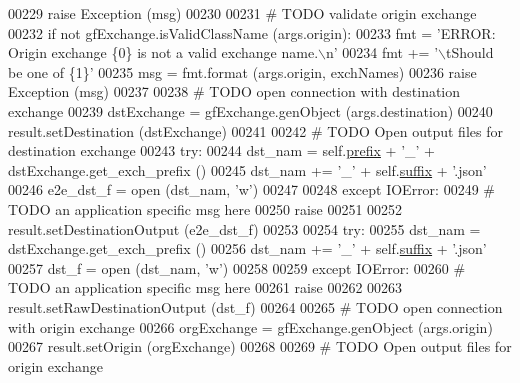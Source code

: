 \begin{DoxyCode}
{00229             \textcolor{keywordflow}{raise} Exception (msg)
00230             
00231         \textcolor{comment}{# TODO validate origin exchange}
00232         \textcolor{keywordflow}{if} \textcolor{keywordflow}{not} gfExchange.isValidClassName (args.origin):
00233             fmt  = \textcolor{stringliteral}{'ERROR: Origin exchange \{0\} is not a valid exchange name.\(\backslash\)n'}
00234             fmt += \textcolor{stringliteral}{'\(\backslash\)tShould be one of \{1\}'}
00235             msg = fmt.format (args.origin, exchNames)
00236             \textcolor{keywordflow}{raise} Exception (msg)
00237         
00238         \textcolor{comment}{# TODO open connection with destination exchange}
00239         dstExchange = gfExchange.genObject (args.destination)
00240         result.setDestination (dstExchange)
00241             
00242         \textcolor{comment}{# TODO Open output files for destination exchange}
00243         \textcolor{keywordflow}{try}:
00244             dst\_nam  =  self.\hyperlink{classe2e_1_1_application_a027ff25e5409ae17584978a09fc2611a}{prefix} + \textcolor{stringliteral}{'\_'} + dstExchange.get\_exch\_prefix ()
00245             dst\_nam += \textcolor{stringliteral}{'\_'} + self.\hyperlink{classe2e_1_1_application_a4d824ad36b051d2d629edb314385df0d}{suffix} + \textcolor{stringliteral}{'.json'}
00246             e2e\_dst\_f = open (dst\_nam, \textcolor{stringliteral}{'w'})
00247             
00248         \textcolor{keywordflow}{except} IOError:
00249             \textcolor{comment}{# TODO an application specific msg here}
00250             \textcolor{keywordflow}{raise}
00251             
00252         result.setDestinationOutput (e2e\_dst\_f)
00253             
00254         \textcolor{keywordflow}{try}:
00255             dst\_nam  = dstExchange.get\_exch\_prefix ()
00256             dst\_nam += \textcolor{stringliteral}{'\_'} + self.\hyperlink{classe2e_1_1_application_a4d824ad36b051d2d629edb314385df0d}{suffix} + \textcolor{stringliteral}{'.json'}
00257             dst\_f = open (dst\_nam, \textcolor{stringliteral}{'w'})
00258             
00259         \textcolor{keywordflow}{except} IOError:
00260             \textcolor{comment}{# TODO an application specific msg here}
00261             \textcolor{keywordflow}{raise}
00262             
00263         result.setRawDestinationOutput (dst\_f)
00264             
00265         \textcolor{comment}{# TODO open connection with origin exchange}
00266         orgExchange = gfExchange.genObject (args.origin)
00267         result.setOrigin (orgExchange)
00268             
00269         \textcolor{comment}{# TODO Open output files for origin exchange}
}
\end{DoxyCode}
